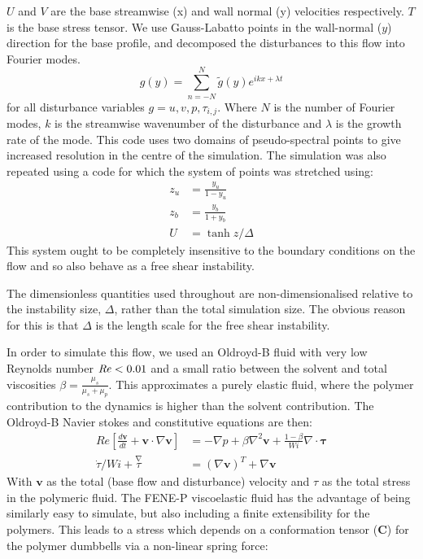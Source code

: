 \documentclass{jfm}
\newcommand{\dt}[1]{\frac{d #1}{d t}} %
\newcommand\Rey{\mbox{\textit{Re}}}  %
\begin{document}
$U$ and $V$ are the base streamwise (x) and wall normal (y) velocities
respectively. $T$ is the base stress tensor. We use Gauss-Labatto points in the
wall-normal ($y$) direction for the base profile, and decomposed the
disturbances to this flow into Fourier modes.  
\begin{equation}
    g(y) = \sum\limits_{n=-N}^{N} \widetilde{g}(y) e^{ikx + \lambda t}
\end{equation}
for all disturbance variables $g = u, v, p, \tau_{i,j}$. Where $N$ is the
number of Fourier modes, $k$ is the streamwise wavenumber of the disturbance
and $\lambda$ is the growth rate of the mode. This code uses two domains of
pseudo-spectral points to give increased resolution in the centre of the
simulation. The simulation was also repeated using a code for which the system
of points was stretched using: 
\begin{align}
    z_{u} &= \frac{y_{u}}{1-y_{u}} \\
    z_{b} &= \frac{y_{b}}{1+y_{b}} \\
    U     &= \tanh{z/\Delta} 
    \label{eq:KH_inf_profile}
\end{align}
This system ought to be completely insensitive to the boundary conditions on
the flow and so also behave as a free shear instability. 

The dimensionless quantities used throughout are non-dimensionalised relative
to the instability size, $\Delta$, rather than the total simulation size. The
obvious reason for this is that $\Delta$ is the length scale for the free shear
instability.

In order to simulate this flow, we used an Oldroyd-B fluid with very low
Reynolds number $\Rey < 0.01$ and a small ratio between the solvent and total
viscosities $\beta = \frac{\mu_{s}}{\mu_{s}+\mu_{p}}$. This approximates a
purely elastic fluid, where the polymer contribution to the dynamics is higher
than the solvent contribution. The Oldroyd-B Navier stokes and constitutive
equations are then: 
\begin{align}
    Re \left[ \dt{\mathbf{v}} + \mathbf{v} \cdot \nabla  \mathbf{v} \right] &=
    - \nabla p + \beta \nabla^{2} \mathbf{v} + \frac{1-\beta}{Wi} \nabla \cdot
    \mathbf{\tau} \\ \dot{\tau}/Wi + \overset{\nabla}\tau &= \left(\nabla
    \mathbf{v}\right)^{T} + \nabla{\mathbf{v}}
\end{align}
With $\mathbf{v}$ as the total (base flow and disturbance) velocity and $\tau$
as the total stress in the polymeric fluid. The FENE-P viscoelastic fluid has
the advantage of being similarly easy to simulate, but also including a finite
extensibility for the polymers. This leads to a stress which depends on a
conformation tensor ($\mathbf{C}$) for the polymer dumbbells via a non-linear
spring force:
\end{document}
